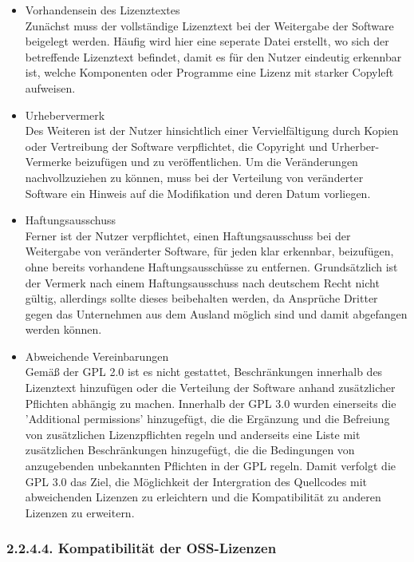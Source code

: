 \begin{itemize}
    \item Vorhandensein des Lizenztextes\\
    Zunächst muss der vollständige Lizenztext bei der Weitergabe der Software beigelegt werden. Häufig wird hier eine seperate Datei erstellt, wo sich der betreffende Lizenztext befindet, damit es für den Nutzer eindeutig erkennbar ist, welche Komponenten oder Programme eine Lizenz mit starker Copyleft aufweisen.

    \item Urhebervermerk\\
    Des Weiteren ist der Nutzer hinsichtlich einer Vervielfältigung durch Kopien oder Vertreibung der Software verpflichtet, die Copyright und Urherber-Vermerke beizufügen und zu veröffentlichen. Um die Veränderungen nachvollzuziehen zu können, muss bei der Verteilung von veränderter Software ein Hinweis auf die Modifikation und deren Datum vorliegen. 
    
    \item Haftungsausschuss\\
    Ferner ist der Nutzer verpflichtet, einen Haftungsausschuss bei der Weitergabe von veränderter Software, für jeden klar erkennbar, beizufügen, ohne bereits vorhandene Haftungsausschüsse zu entfernen. Grundsätzlich ist der Vermerk nach einem Haftungsausschuss nach deutschem Recht nicht gültig, allerdings sollte dieses beibehalten werden, da Ansprüche Dritter gegen das Unternehmen aus dem Ausland möglich sind und damit abgefangen werden können.  

    \item Abweichende Vereinbarungen\\
    Gemäß der GPL 2.0 ist es nicht gestattet, Beschränkungen innerhalb des Lizenztext hinzufügen oder die Verteilung der Software anhand zusätzlicher Pflichten abhängig zu machen. Innerhalb der GPL 3.0 wurden einerseits die 'Additional permissions' hinzugefügt, die die Ergänzung und die Befreiung von zusätzlichen Lizenzpflichten regeln und anderseits eine Liste mit zusätzlichen Beschränkungen hinzugefügt, die die Bedingungen von anzugebenden unbekannten Pflichten in der GPL regeln. Damit verfolgt die GPL 3.0 das Ziel, die Möglichkeit der Intergration des Quellcodes mit abweichenden Lizenzen zu erleichtern und die Kompatibilität zu anderen Lizenzen zu erweitern.     
\end{itemize}

\subsubsection{2.2.4.4. Kompatibilität der OSS-Lizenzen}$~$

